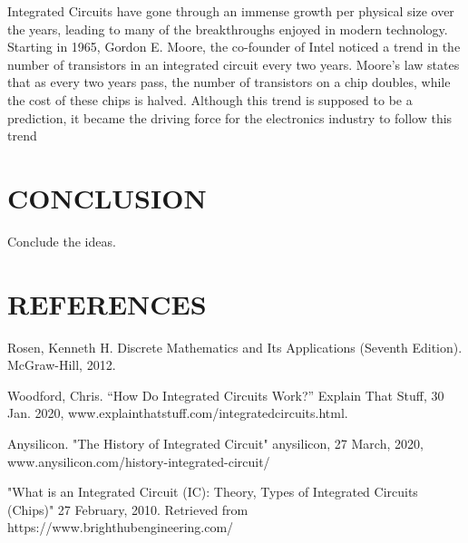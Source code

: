 \documentclass[letterpaper, 10 pt, conference]{IEEEconf}
\begin{document}
Integrated Circuits have gone through an immense growth per physical size over the years, leading to many of the breakthroughs enjoyed in modern technology. Starting in 1965, Gordon E. Moore, the co-founder of Intel noticed a trend in the number of transistors in an integrated circuit every two years. Moore’s law states that as every two years pass, the number of transistors on a chip doubles, while the cost of these chips is halved. Although this trend is supposed to be a prediction, it became the driving force for the electronics industry to follow this trend

\section{CONCLUSION}

Conclude the ideas.

\section*{REFERENCES}


\begin{enumerate}[label={[\arabic*]}]
\item Rosen, Kenneth  H. Discrete Mathematics and Its Applications (Seventh Edition). McGraw-Hill, 2012. 
\item Woodford, Chris. “How Do Integrated Circuits Work?” Explain That Stuff, 30 Jan. 2020, www.explainthatstuff.com/integratedcircuits.html. 
\item Anysilicon. "The History of Integrated Circuit" anysilicon, 27 March, 2020,
www.anysilicon.com/history-integrated-circuit/
\item "What is an Integrated Circuit (IC): Theory, Types of Integrated Circuits (Chips)" 27 February, 2010. Retrieved from https://www.brighthubengineering.com/


\end{enumerate}
\end{document}

